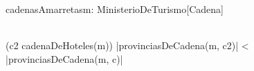 \begin{problema}{cadenasAmarretas}{m: MinisterioDeTurismo}{[Cadena]}
	\medskip
	
	\medskip
	
	{
		\\ \lnot (\exists c2 \selec cadenaDeHoteles(m)) |provinciasDeCadena(m, c2)| < |provinciasDeCadena(m, c)|		
	}	
\end{problema}
